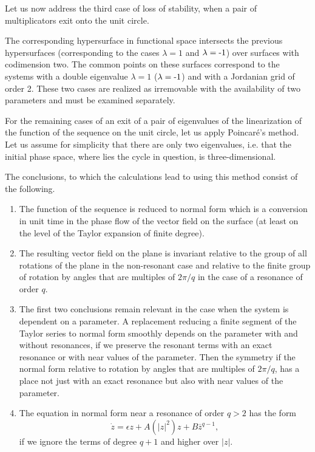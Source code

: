 \documentclass[12pt]{amsart}
\begin{document}
Let us now address the third case of loss of stability, when a pair of
multiplicators exit onto the unit circle.

The corresponding hypersurface in functional space intersects the previous
hypersurfaces (corresponding to the cases $\lambda=1$ and $\lambda=\text-1$)
over surfaces with codimension two.
The common points on these surfaces correspond to the systems with a double
eigenvalue $\lambda=1$ ($\lambda=\text-1$) and with a Jordanian grid of order 2.
These two cases are realized as irremovable with the availability of two
parameters and must be examined separately.

For the remaining cases of an exit of a pair of eigenvalues of the linearization
of the function of the sequence on the unit circle, let us apply Poincar\'e's
method.
Let us assume for simplicity that there are only two eigenvalues, i.e. that the
initial phase space, where lies the cycle in question, is three-dimensional.

The conclusions, to which the calculations lead to using this method consist of
the following.
\begin{enumerate}
\item The function of the sequence is reduced to normal form which is a
conversion in unit time in the phase flow of the vector field on the surface (at
least on the level of the Taylor expansion of finite degree).
\item The resulting vector field on the plane is invariant relative to the group
of all rotations of the plane in the non-resonant case and relative to the
finite group of rotation by angles that are multiples of $2\pi/q$ in the case of
a resonance of order $q$.
\item The first two conclusions remain relevant in the case when the system is
dependent on a parameter.
A replacement reducing a finite segment of the Taylor series to normal form
smoothly depends on the parameter with and without resonances, if we preserve
the resonant terms with an exact resonance or with near values of the parameter.
Then the symmetry if the normal form relative to rotation by angles that are
multiples of $2\pi/q$, has a place not just with an exact resonance but also
with near values of the parameter.
\item The equation in normal form near a resonance of order $q>2$ has the form
$$\dot z=\epsilon z+A(|z|^2)z+B\overline z^{q-1},$$
if we ignore the terms of degree $q+1$ and higher over $|z|$.
\end{enumerate}
\end{document}
